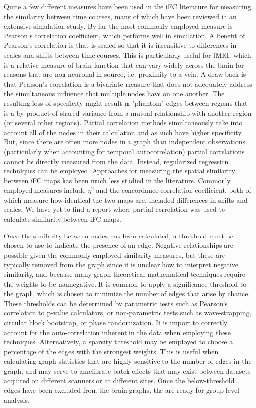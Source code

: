 Quite a few different measures have been used in the iFC literature for measuring the similarity between time courses, many of which have been reviewed in an extensive simulation study\cite{smith2010}. By far the most commonly employed measure is Pearson's correlation coefficient, which performs well in simulation\cite{smith2010}. A benefit of Pearson's correlation is that is scaled so that it is insensitive to differences in scales and shifts between time courses. This is particularly useful for fMRI, which is a relative measure of brain function that can vary widely across the brain for reasons that are non-neuronal in source, i.e. proximity to a vein. A draw back is that Pearson's correlation is a bivariate measure that does not adequately address the simultaneous influence that multiple nodes have on one another. The resulting loss of specificity might result in "phantom" edges between regions that is a by-product of shared variance from a mutual relationship with another region (or several other regions). Partial correlation methods simultaneously take into account all of the nodes in their calculation and as such have higher specificity. But, since there are often more nodes in a graph than independent observations (particularly when accounting for temporal autocorrelation) partial correlations cannot be directly measured from the data. Instead, regularized regression techniques can be employed\cite{VaroquauxCraddock2013}. Approaches for measuring the spatial similarity between iFC maps has been much less studied in the literature. Commonly employed measures include $\eta^2$\cite{} and the concordance correlation coefficient\cite{}, both of which measure how identical the two maps are, included differences in shifts and scales. We have yet to find a report where partial correlation was used to calculate similarity between iFC maps.

Once the similarity between nodes has been calculated, a threshold must be chosen to use to indicate the presence of an edge. Negative relationships are possible given the commonly employed similarity measures, but these are typically removed from the graph since it is unclear how to interpret negative similarity, and because many graph theoretical mathematical techniques require the weights to be nonnegative. It is common to apply a significance threshold to the graph, which is chosen to minimize the number of edges that arise by chance. These thresholds can be determined by parametric tests such as Pearson's correlation to p-value calculators, or non-parametric tests such as wave-strapping\cite{breakspear}, circular block bootstrap\cite{bellec}, or phase randomization\cite{zhen}. It is import to correctly account for the auto-correlation inherent in the data when employing these techniques. Alternatively, a sparsity threshold may be employed to choose a percentage of the edges with the strongest weights. This is useful when calculating graph statistics that are highly sensitive to the number of edges in the graph, and may serve to ameliorate batch-effects that may exist between datasets acquired on different scanners or at different sites\cite{Chaogan}. Once the below-threshold edges have been excluded from the brain graphs, the are ready for group-level analysis. 

